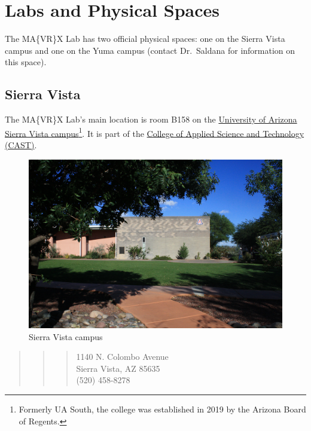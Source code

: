\documentclass[]{tufte-book}
\begin{document}
\hypertarget{spaces}{%
\chapter{Labs and Physical Spaces}\label{spaces}}

The MA\{VR\}X Lab has two official physical spaces: one on the Sierra Vista campus and one on the Yuma campus (contact Dr.~Saldana for information on this space).

\hypertarget{sierra-vista}{%
\section{Sierra Vista}\label{sierra-vista}}

The MA\{VR\}X Lab's main location is room B158 on the \href{https://azcast.arizona.edu/about}{University of Arizona Sierra Vista campus}\footnote{Formerly UA South, the college was established in 2019 by the Arizona Board of Regents.}. It is part of the \href{https://azcast.arizona.edu/locations}{College of Applied Science and Technology (CAST)}.

\begin{figure}
\centering
\includegraphics{images/azcast_building.jpg}
\caption{Sierra Vista campus}
\end{figure}

\begin{quote}
\begin{quote}
\begin{quote}
1140 N. Colombo Avenue\\
Sierra Vista, AZ 85635\\
(520) 458-8278
\end{quote}
\end{quote}
\end{quote}
\end{document}

